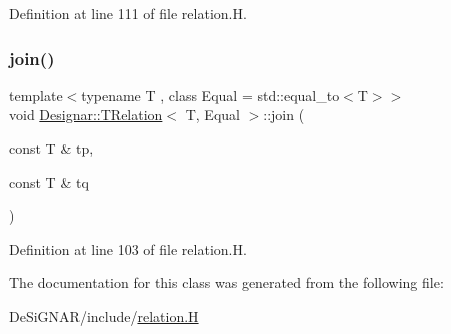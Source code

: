 Definition at line 111 of file relation.\+H.

\mbox{\label{class_designar_1_1_t_relation_a484b21a54f5d2b9862487fbb8b5ac1e7}} 
\subsubsection{\texorpdfstring{join()}{join()}}
{\footnotesize\ttfamily template$<$typename T , class Equal  = std\+::equal\+\_\+to$<$\+T$>$$>$ \\
void \hyperlink{class_designar_1_1_t_relation}{Designar\+::\+T\+Relation}$<$ T, Equal $>$\+::join (\begin{DoxyParamCaption}\item[{const T \&}]{tp,  }\item[{const T \&}]{tq }\end{DoxyParamCaption})\hspace{0.3cm}{\ttfamily [inline]}}



Definition at line 103 of file relation.\+H.



The documentation for this class was generated from the following file\+:\begin{DoxyCompactItemize}
\item 
De\+Si\+G\+N\+A\+R/include/\hyperlink{relation_8_h}{relation.\+H}\end{DoxyCompactItemize}
